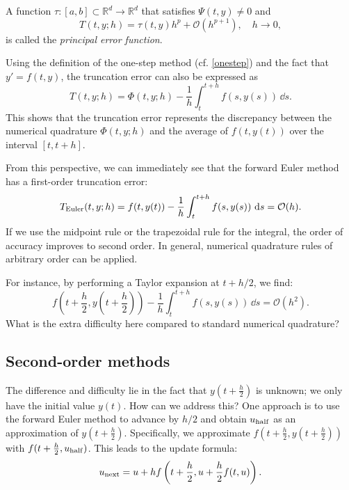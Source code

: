 \documentclass[10pt]{amsart}
\begin{document}
\begin{definition}
A function $\tau: [a, b] \subset \mathbb{R}^d \to \mathbb{R}^d$ that satisfies $\Psi(t, y) \neq 0$ and  
\begin{equation}\label{eq:principal_error}
T(t, y; h) = \tau(t, y) h^p + \mathcal{O}(h^{p+1}), \quad h \to 0,  
\end{equation}  
is called the \emph{principal error function}.
\end{definition}

Using the definition of the one-step method (cf. \eqref{onestep}) and the fact that $y' = f(t, y)$, the truncation error can also be expressed as  
\begin{equation}\label{eq:Tphi}  
T(t, y; h) = \Phi(t, y; h) - \frac{1}{h} \int_{t}^{t+h} f(s, y(s)) \, \dd s.  
\end{equation}  
This shows that the truncation error represents the discrepancy between the numerical quadrature $\Phi(t, y; h)$ and the average of $f(t, y(t))$ over the interval $[t, t+h]$.  

From this perspective, we can immediately see that the forward Euler method has a first-order truncation error:  
$$  
T_{\rm Euler}(t, y; h) = f(t, y(t)) - \frac{1}{h} \int_{t}^{t+h} f(s, y(s)) \, \,{\rm d} s = \mathcal{O}(h).  
$$  
If we use the midpoint rule or the trapezoidal rule for the integral, the order of accuracy improves to second order. In general, numerical quadrature rules of arbitrary order can be applied.  

For instance, by performing a Taylor expansion at $t + h/2$, we find:  
$$  
f\left(t + \frac{h}{2}, y\left(t + \frac{h}{2}\right)\right) - \frac{1}{h} \int_{t}^{t+h} f(s, y(s)) \, \dd s = \mathcal{O}(h^2).  
$$  
What is the extra difficulty here compared to standard numerical quadrature?  

\subsection{Second-order methods}
The difference and difficulty lie in the fact that $y(t + \frac{h}{2})$ is unknown; we only have the initial value $y(t)$. How can we address this? One approach is to use the forward Euler method to advance by $h/2$ and obtain $u_{\rm half}$ as an approximation of $y(t + \frac{h}{2})$. Specifically, we approximate $f(t + \frac{h}{2}, y(t + \frac{h}{2}))$ with $f(t + \frac{h}{2}, u_{\rm half})$. This leads to the update formula:  
$$  
u_{\rm next} = u + h f\left(t + \frac{h}{2}, u + \frac{h}{2} f(t, u)\right).  
$$  
\end{document}
